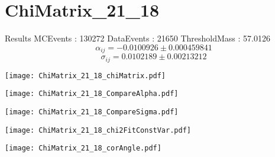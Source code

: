 \documentclass[a4paper,12pt]{article}
\begin{document}
\section{ChiMatrix\_21\_18}
\begin{minipage}{0.49\linewidth} Results \newline
MCEvents : 130272\newline
DataEvents : 21650 \newline
ThresholdMass : 57.0126\\
$$\alpha_{ij} = -0.0100926\pm 0.000459841$$
$$\sigma_{ij} = 0.0102189\pm 0.00213212$$
\end{minipage}\hfill
\begin{minipage}{0.49\linewidth} 
\texttt{[image: ChiMatrix\_21\_18\_chiMatrix.pdf]}\\
\end{minipage}
\hfill
\begin{minipage}{0.49\linewidth} 
\texttt{[image: ChiMatrix\_21\_18\_CompareAlpha.pdf]}\\
\end{minipage}
\hfill
\begin{minipage}{0.49\linewidth} 
\texttt{[image: ChiMatrix\_21\_18\_CompareSigma.pdf]}\\
\end{minipage}
\begin{minipage}{0.49\linewidth} 
\texttt{[image: ChiMatrix\_21\_18\_chi2FitConstVar.pdf]}\\
\end{minipage}
\hfill
\begin{minipage}{0.49\linewidth} 
\texttt{[image: ChiMatrix\_21\_18\_corAngle.pdf]}\\
\end{minipage}
\end{document}
